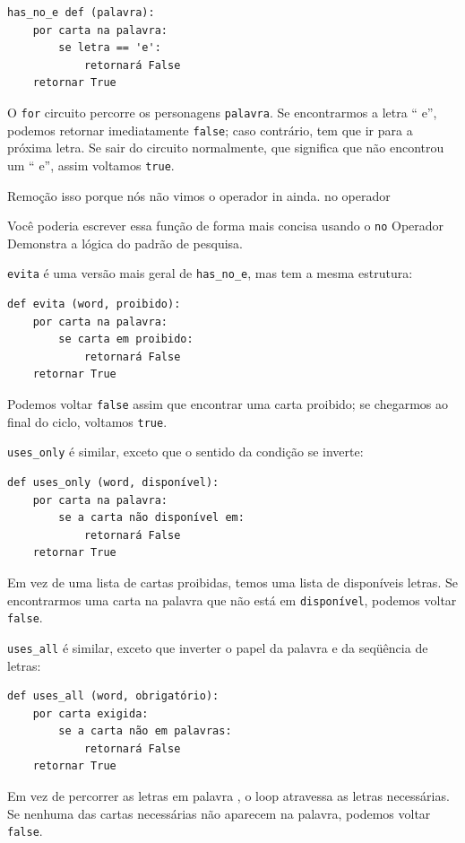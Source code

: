 \documentclass[10pt]{book}
\begin{document}
\begin{verbatim}
has_no_e def (palavra):
    por carta na palavra:
        se letra == 'e':
            retornará False
    retornar True
\end{verbatim}
%
O {\tt for} circuito percorre os personagens {\tt palavra}. Se encontrarmos
a letra `` e'', podemos retornar imediatamente {\tt false}; caso contrário,
tem que ir para a próxima letra. Se sair do circuito normalmente, que
significa que não encontrou um `` e'', assim voltamos {\tt true}.

Remoção isso porque nós não vimos o operador in ainda.
\index{} no operador

Você poderia escrever essa função de forma mais concisa usando o {\tt no}
Operador%
Demonstra a lógica do padrão de pesquisa.

{\tt evita} é uma versão mais geral de \verb "has_no_e", mas
tem a mesma estrutura:

\begin{verbatim}
def evita (word, proibido):
    por carta na palavra:
        se carta em proibido:
            retornará False
    retornar True
\end{verbatim}
%
Podemos voltar {\tt false} assim que encontrar uma carta proibido;
se chegarmos ao final do ciclo, voltamos {\tt true}.

\Verb "uses_only" é similar, exceto que o sentido da condição
se inverte:

\begin{verbatim}
def uses_only (word, disponível):
    por carta na palavra: 
        se a carta não disponível em:
            retornará False
    retornar True
\end{verbatim}
%
Em vez de uma lista de cartas proibidas, temos uma lista de disponíveis
letras. Se encontrarmos uma carta na palavra {\tt} que não está em
{\tt disponível}, podemos voltar {\tt false}.

\Verb "uses_all" é similar, exceto que inverter o papel
da palavra e da seqüência de letras:

\begin{verbatim}
def uses_all (word, obrigatório):
    por carta exigida: 
        se a carta não em palavras:
            retornará False
    retornar True
\end{verbatim}
%
Em vez de percorrer as letras em {palavra \tt}, o loop
atravessa as letras necessárias. Se nenhuma das cartas necessárias
não aparecem na palavra, podemos voltar {\tt false}.
\end{document}
